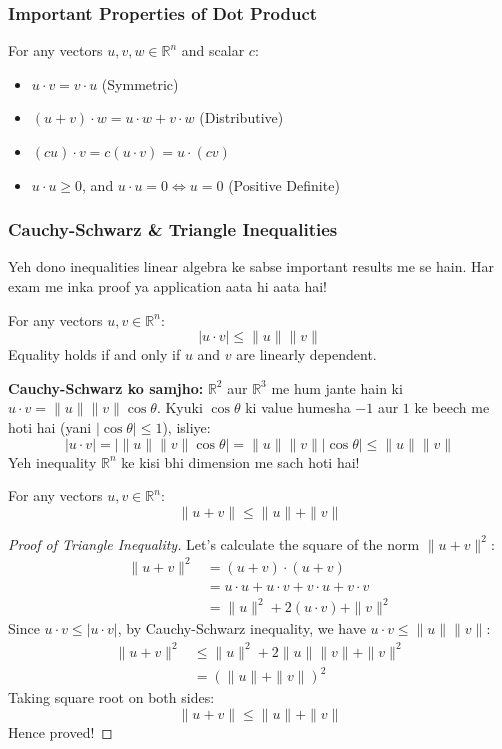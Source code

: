 \documentclass[11pt,a4paper]{article}
\begin{document}
\subsubsection{Important Properties of Dot Product}
For any vectors $u, v, w \in \mathbb{R}^n$ and scalar $c$:
\begin{itemize}
    \item $u \cdot v = v \cdot u$ (Symmetric)
    \item $(u + v) \cdot w = u \cdot w + v \cdot w$ (Distributive)
    \item $(c u) \cdot v = c (u \cdot v) = u \cdot (c v)$
    \item $u \cdot u \ge 0$, and $u \cdot u = 0 \iff u = 0$ (Positive Definite)
\end{itemize}

\subsubsection{Cauchy-Schwarz \& Triangle Inequalities}
Yeh dono inequalities linear algebra ke sabse important results me se hain. Har exam me inka proof ya application aata hi aata hai!

\begin{theorembox}
For any vectors $u, v \in \mathbb{R}^n$:
\[ |u \cdot v| \le \|u\| \|v\| \]
Equality holds if and only if $u$ and $v$ are linearly dependent.
\end{theorembox}

\begin{hinglishbox}
\textbf{Cauchy-Schwarz ko samjho:}
$\mathbb{R}^2$ aur $\mathbb{R}^3$ me hum jante hain ki $u \cdot v = \|u\| \|v\| \cos\theta$.
Kyuki $\cos\theta$ ki value humesha $-1$ aur $1$ ke beech me hoti hai (yani $|\cos\theta| \le 1$), isliye:
\[ |u \cdot v| = | \|u\| \|v\| \cos\theta | = \|u\| \|v\| |\cos\theta| \le \|u\| \|v\| \]
Yeh inequality $\mathbb{R}^n$ ke kisi bhi dimension me sach hoti hai!
\end{hinglishbox}

\begin{theorembox}
For any vectors $u, v \in \mathbb{R}^n$:
\[ \|u + v\| \le \|u\| + \|v\| \]
\end{theorembox}

\begin{proof}[Proof of Triangle Inequality]
Let's calculate the square of the norm $\|u+v\|^2$:
\begin{align*}
\|u + v\|^2 &= (u + v) \cdot (u + v) \\
&= u \cdot u + u \cdot v + v \cdot u + v \cdot v \\
&= \|u\|^2 + 2(u \cdot v) + \|v\|^2
\end{align*}
Since $u \cdot v \le |u \cdot v|$, by Cauchy-Schwarz inequality, we have $u \cdot v \le \|u\| \|v\|$:
\begin{align*}
\|u + v\|^2 &\le \|u\|^2 + 2\|u\| \|v\| + \|v\|^2 \\
&= (\|u\| + \|v\|)^2
\end{align*}
Taking square root on both sides:
\[ \|u + v\| \le \|u\| + \|v\| \]
Hence proved!
\end{proof}
\end{document}
